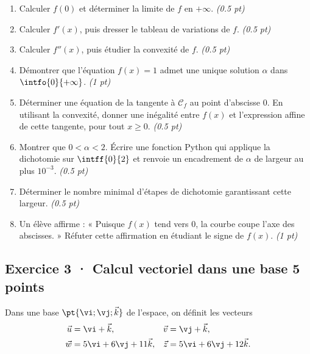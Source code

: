 \begin{enumerate}

\item Calculer $f(0)$ et déterminer la limite de $f$ en $+\infty$. \hfill\textit{(\num{0,5} pt)}

\item Calculer $f' (x)$, puis dresser le tableau de variations de $f$. \hfill\textit{(\num{0,5} pt)}

\item Calculer $f'' (x)$, puis étudier la convexité de $f$. \hfill\textit{(\num{0,5} pt)}

\item Démontrer que l'équation $f(x)=1$ admet une unique solution $\alpha$ dans $\intfo{0}{+\infty}$. \hfill\textit{(1 pt)}

\item Déterminer une équation de la tangente à $\mathcal C_f$ au point d'abscisse $0$. En utilisant la convexité, donner une inégalité entre $f(x)$ et l'expression affine de cette tangente, pour tout $x\ge0$. \hfill\textit{(\num{0,5} pt)}

\item Montrer que $0<\alpha<2$. Écrire une fonction Python qui applique la dichotomie sur $\intff{0}{2}$ et renvoie un encadrement de $\alpha$ de largeur au plus $10^{-3}$. \hfill\textit{(\num{0,5} pt)}

\item Déterminer le nombre minimal d'étapes de dichotomie garantissant cette largeur. \hfill\textit{(\num{0,5} pt)}

\item Un élève affirme : « Puisque $f(x)$ tend vers $0$, la courbe coupe l'axe des abscisses. » Réfuter cette affirmation en étudiant le signe de $f(x)$. \hfill\textit{(1 pt)}

\end{enumerate}

\mxnewpage{}

\subsection*{Exercice 3 · Calcul vectoriel dans une base \hfill 5 points}Dans une base $\pt{\vi;\vj;\vec k}$ de l'espace, on définit les vecteurs
\[\begin{aligned}\vec u&=\vi+\vec k,&\vec v&=\vj+\vec k,\\
\vec w&=5\vi+6\vj+11\vec k,&\vec z&=5\vi+6\vj+12\vec k.\end{aligned}\]

